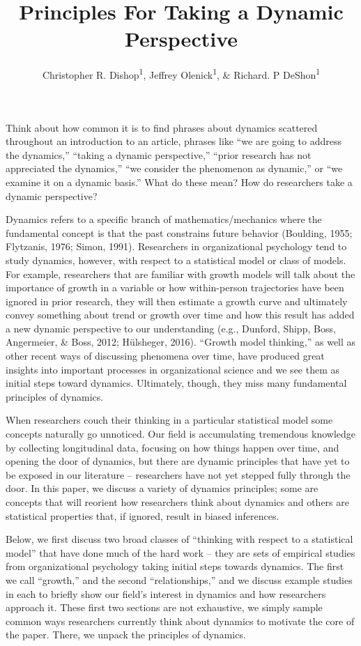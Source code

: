 \documentclass[english,,man]{apa6}
\title{Principles For Taking a Dynamic Perspective}
\author{Christopher R. Dishop\textsuperscript{1}, Jeffrey Olenick\textsuperscript{1}, \& Richard. P DeShon\textsuperscript{1}}
\date{}
\affiliation{
\vspace{0.5cm}
\textsuperscript{1} Michigan State University}
\begin{document}
\maketitle

Think about how common it is to find phrases about dynamics scattered throughout an introduction to an article, phrases like \enquote{we are going to address the dynamics,} \enquote{taking a dynamic perspective,} \enquote{prior research has not appreciated the dynamics,} \enquote{we consider the phenomenon as dynamic,} or \enquote{we examine it on a dynamic basis.} What do these mean? How do researchers take a dynamic perspective?

Dynamics refers to a specific branch of mathematics/mechanics where the fundamental concept is that the past constrains future behavior (Boulding, 1955; Flytzanis, 1976; Simon, 1991). Researchers in organizational psychology tend to study dynamics, however, with respect to a statistical model or class of models. For example, researchers that are familiar with growth models will talk about the importance of growth in a variable or how within-person trajectories have been ignored in prior research, they will then estimate a growth curve and ultimately convey something about trend or growth over time and how this result has added a new dynamic perspective to our understanding (e.g., Dunford, Shipp, Boss, Angermeier, \& Boss, 2012; Hülsheger, 2016). \enquote{Growth model thinking,} as well as other recent ways of discussing phenomena over time, have produced great insights into important processes in organizational science and we see them as initial steps toward dynamics. Ultimately, though, they miss many fundamental principles of dynamics.

When researchers couch their thinking in a particular statistical model some concepts naturally go unnoticed. Our field is accumulating tremendous knowledge by collecting longitudinal data, focusing on how things happen over time, and opening the door of dynamics, but there are dynamic principles that have yet to be exposed in our literature -- researchers have not yet stepped fully through the door. In this paper, we discuss a variety of dynamics principles; some are concepts that will reorient how researchers think about dynamics and others are statistical properties that, if ignored, result in biased inferences.

Below, we first discuss two broad classes of \enquote{thinking with respect to a statistical model} that have done much of the hard work -- they are sets of empirical studies from organizational psychology taking initial steps towards dynamics. The first we call \enquote{growth,} and the second \enquote{relationships,} and we discuss example studies in each to briefly show our field's interest in dynamics and how researchers approach it. These first two sections are not exhaustive, we simply sample common ways researchers currently think about dynamics to motivate the core of the paper. There, we unpack the principles of dynamics.
\end{document}
